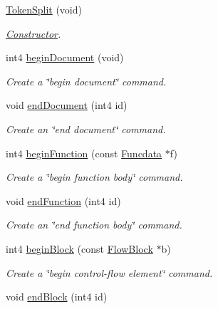 \begin{DoxyCompactItemize}
\item 
\mbox{\hyperlink{class_token_split_a3930a11055f647516cd50c761b347ace}{Token\+Split}} (void)
\begin{DoxyCompactList}\small\item\em \mbox{\hyperlink{class_constructor}{Constructor}}. \end{DoxyCompactList}\item 
int4 \mbox{\hyperlink{class_token_split_a512f5438d3d735ae7ba82dca9afc882c}{begin\+Document}} (void)
\begin{DoxyCompactList}\small\item\em Create a \char`\"{}begin document\char`\"{} command. \end{DoxyCompactList}\item 
void \mbox{\hyperlink{class_token_split_acf7d7054bbd3afe3c8d609484fec0e9e}{end\+Document}} (int4 id)
\begin{DoxyCompactList}\small\item\em Create an \char`\"{}end document\char`\"{} command. \end{DoxyCompactList}\item 
int4 \mbox{\hyperlink{class_token_split_a53510d715ff1109c33f75226e429d8e7}{begin\+Function}} (const \mbox{\hyperlink{class_funcdata}{Funcdata}} $\ast$f)
\begin{DoxyCompactList}\small\item\em Create a \char`\"{}begin function body\char`\"{} command. \end{DoxyCompactList}\item 
void \mbox{\hyperlink{class_token_split_a1be7d58dbc149fc75b6467e3c02ddb65}{end\+Function}} (int4 id)
\begin{DoxyCompactList}\small\item\em Create an \char`\"{}end function body\char`\"{} command. \end{DoxyCompactList}\item 
int4 \mbox{\hyperlink{class_token_split_ae7fb2a1b9de2cf7fd1348dca6177a07b}{begin\+Block}} (const \mbox{\hyperlink{class_flow_block}{Flow\+Block}} $\ast$b)
\begin{DoxyCompactList}\small\item\em Create a \char`\"{}begin control-\/flow element\char`\"{} command. \end{DoxyCompactList}\item 
void \mbox{\hyperlink{class_token_split_ab68c64d47f6d2456c645af28d9200425}{end\+Block}} (int4 id)

\end{DoxyCompactItemize}
